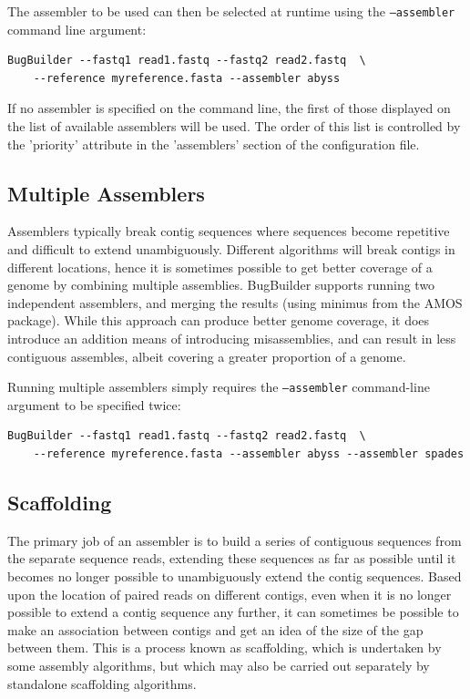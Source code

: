 \documentclass[a4paper,twoside,10pt]{article}
\begin{document}
The assembler to be used can then be selected at runtime using the {\tt --assembler} command line
argument: 

\begin{verbatim}
BugBuilder --fastq1 read1.fastq --fastq2 read2.fastq  \
    --reference myreference.fasta --assembler abyss 
\end{verbatim}

If no assembler is specified on the command line, the first of those displayed on the list of
available assemblers will be used. The order of this list is controlled by the 'priority' attribute
in the 'assemblers' section of the configuration file.

\subsection{Multiple Assemblers}

Assemblers typically break contig sequences where sequences become repetitive and difficult to
extend unambiguously. Different algorithms will break contigs in different locations, hence it is
sometimes possible to get better coverage of a genome by combining multiple assemblies. BugBuilder
supports running two independent assemblers, and merging the results (using minimus from the AMOS
package). While this approach can produce better genome coverage, it does introduce an addition
means of introducing misassemblies, and can result in less contiguous assembles, albeit covering a
greater proportion of a genome. 

Running multiple assemblers simply requires the {\tt --assembler} command-line argument to be
specified twice:

\begin{verbatim}
BugBuilder --fastq1 read1.fastq --fastq2 read2.fastq  \
    --reference myreference.fasta --assembler abyss --assembler spades
\end{verbatim}

\subsection{Scaffolding}

The primary job of an assembler is to build a series of contiguous sequences from the separate
sequence reads, extending these sequences as far as possible until it becomes no longer possible to
unambiguously extend the contig sequences. Based upon the location of paired reads on different
contigs, even when it is no longer possible to extend a contig sequence any further, it can
sometimes be possible to make an association between  contigs and get an idea of the size of the
gap between them. This is a process known as scaffolding, which is undertaken by some assembly
algorithms, but which may also be carried out separately by standalone scaffolding algorithms.
\end{document}
